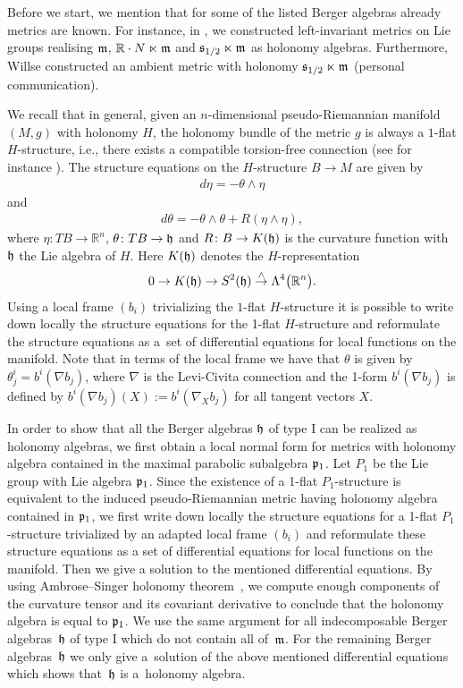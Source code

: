\documentclass[pdftex]{sigma}
\numberwithin{equation}{section}
\newcommand\fh{{\frak h}}
\newcommand\fm{{\frak m}}
\newcommand\fs{{\frak s}}
\newcommand\RR{{\mathbb R}}
\begin{document}
Before we start, we mention that for some of the listed Berger algebras already metrics are known. For instance, in \cite{FK}, we constructed left-invariant metrics on Lie groups realising $\fm$, $\RR\cdot N\ltimes \fm$ and $\fs_{1/2}\ltimes \fm$ as holonomy algebras. Furthermore, Willse constructed an ambient metric with holonomy $\fs_{1/2}\ltimes \fm$ (personal communication).

We recall that in general, given an $n$-dimensional pseudo-Riemannian manifold $(M, g)$ with holonomy $H$, the holonomy bundle of the metric $g$ is always a $1$-flat $H$-structure, i.e., there exists a compatible torsion-free connection (see for instance \cite{Bryant}). The structure equations on the $H$-structure $B \rightarrow M$ are given by
\begin{gather*}
d \eta = - \theta \wedge \eta
\end{gather*}
and
\begin{gather*}
d \theta = - \theta \wedge \theta +R (\eta \wedge \eta),
\end{gather*}
where $\eta\colon TB \rightarrow {\mathbb R}^n$, $\theta\colon TB \rightarrow \frak h$ and $R\colon B \rightarrow K (\frak h)$ is the curvature function with $\frak h$ the Lie algebra of $H$. Here $K (\frak h)$ denotes the $H$-representation
\begin{gather*}
0 \rightarrow K (\frak h) \rightarrow S^2 (\frak h) \overset{\wedge}{\rightarrow} \Lambda^4 \big(\mathbb R^n\big).
\end{gather*}
Using a local frame $(b_i)$ trivializing the $1$-flat $H$-structure it is possible to write down locally the structure equations for the 1-flat $H$-structure and reformulate the structure equations as a~set of differential equations for local functions on the manifold. Note that in terms of the local frame we have that $\theta$ is given by $\theta^i_j=b^i(\nabla{b_j})$, where $\nabla$ is the Levi-Civita connection and the 1-form $b^i(\nabla{b_j})$ is defined by $b^i(\nabla{b_j})(X):=b^i(\nabla_X{b_j})$ for all tangent vectors $X$.

In order to show that all the Berger algebras $\frak h$ of type I can be realized as holonomy algebras, we first obtain a local normal form for metrics with holonomy algebra contained in the maximal parabolic subalgebra $\frak p_1$. Let $P_1$ be the Lie group with Lie algebra $\frak p_1$. Since the existence of a 1-flat $P_1$-structure is equivalent to the induced pseudo-Riemannian metric having holonomy algebra contained in $\frak p_1$, we first write down locally the structure equations for a 1-flat $P_1$-structure trivialized by an adapted local frame $(b_i)$ and reformulate these structure equations as a set of differential equations for local functions on the manifold. Then we give a solution to the mentioned differential equations. By using Ambrose--Singer holonomy theorem~\cite{AS}, we compute enough components of the curvature tensor and its covariant derivative to conclude that the holonomy algebra is equal to $\frak p_1$. We use the same argument for all indecomposable Berger algebras~$\frak h$ of type I which do not contain all of~$\frak m$. For the remaining Berger algebras~$\frak h$ we only give a~solution of the above mentioned differential equations which shows that~$\fh$ is a~holonomy algebra.
\end{document}
